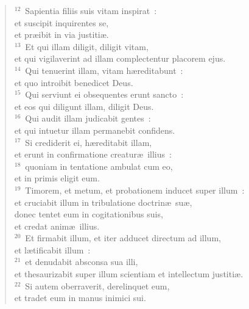 \begin{verse}${}^{12}$~Sapientia filiis suis vitam inspirat~:\\ et suscipit inquirentes se,\\ et pr\ae ibit in via justiti\ae .\\
${}^{13}$~Et qui illam diligit, diligit vitam,\\ et qui vigilaverint ad illam complectentur placorem ejus.\\
${}^{14}$~Qui tenuerint illam, vitam h\ae reditabunt~:\\ et quo introibit benedicet Deus.\\
${}^{15}$~Qui serviunt ei obsequentes erunt sancto~:\\ et eos qui diligunt illam, diligit Deus.\\
${}^{16}$~Qui audit illam judicabit gentes~:\\ et qui intuetur illam permanebit confidens.\\
${}^{17}$~Si crediderit ei, h\ae reditabit illam,\\ et erunt in confirmatione creatur\ae\ illius~:\\
${}^{18}$~quoniam in tentatione ambulat cum eo,\\ et in primis eligit eum.\\
${}^{19}$~Timorem, et metum, et probationem inducet super illum~:\\ et cruciabit illum in tribulatione doctrin\ae\ su\ae ,\\ donec tentet eum in cogitationibus suis,\\ et credat anim\ae\ illius.\\
${}^{20}$~Et firmabit illum, et iter adducet directum ad illum,\\ et l\ae tificabit illum~:\\
${}^{21}$~et denudabit absconsa sua illi,\\ et thesaurizabit super illum scientiam et intellectum justiti\ae .\\
${}^{22}$~Si autem oberraverit, derelinquet eum,\\ et tradet eum in manus inimici sui.\end{verse}


